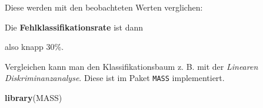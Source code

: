 \documentclass[12pt,]{book}
\newenvironment{Shaded}{\begin{snugshade}}{\end{snugshade}}
\newcommand{\KeywordTok}[1]{\textcolor[rgb]{0.13,0.29,0.53}{\textbf{{#1}}}}
\newcommand{\DataTypeTok}[1]{\textcolor[rgb]{0.13,0.29,0.53}{{#1}}}
\newcommand{\StringTok}[1]{\textcolor[rgb]{0.31,0.60,0.02}{{#1}}}
\newcommand{\CommentTok}[1]{\textcolor[rgb]{0.56,0.35,0.01}{\textit{{#1}}}}
\newcommand{\NormalTok}[1]{{#1}}
\begin{document}
Diese werden mit den beobachteten Werten verglichen:

\begin{Shaded}
\end{Shaded}

Die \textbf{Fehlklassifikationsrate} ist dann

\begin{Shaded}
\end{Shaded}

also knapp 30\%.

Vergleichen kann man den Klassifikationsbaum z. B. mit der
\emph{Linearen Diskriminanzanalyse}. Diese ist im Paket \texttt{MASS}
implementiert.

\begin{Shaded}
\begin{Highlighting}[]
\KeywordTok{library}\NormalTok{(MASS)}
\end{Highlighting}
\end{Shaded}
\end{document}
